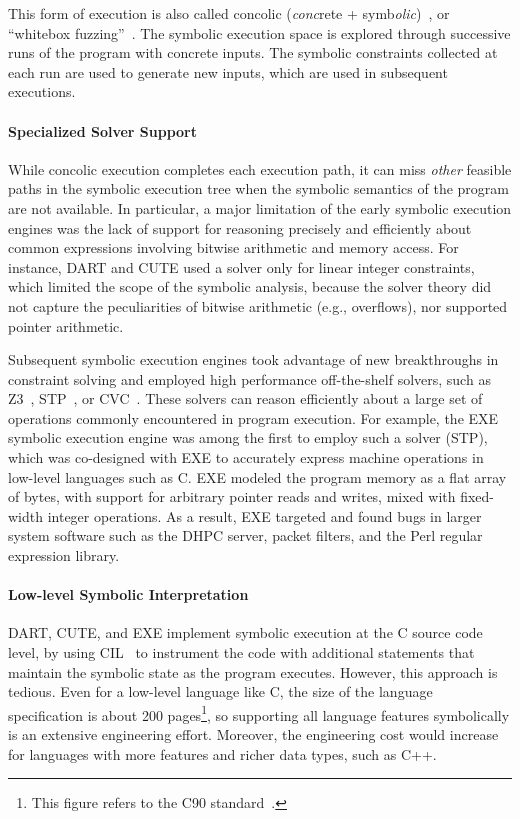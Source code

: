 This form of execution is also called concolic (\emph{conc}rete + symb\emph{olic})~\cite{cute}, or ``whitebox fuzzing''~\cite{godefroid:fuzz}.  The symbolic execution space is explored through successive runs of the program with concrete inputs.  The symbolic constraints collected at each run are used to generate new inputs, which are used in subsequent executions.


\paragraph{Specialized Solver Support}

While concolic execution completes each execution path, it can miss \emph{other} feasible paths in the symbolic execution tree when the symbolic semantics of the program are not available.
%
In particular, a major limitation of the early symbolic execution engines was the lack of support for reasoning precisely and efficiently about common expressions involving bitwise arithmetic and memory access.
%
For instance, DART and CUTE used a solver only for linear integer constraints, which limited the scope of the symbolic analysis, because the solver theory did not capture the peculiarities of bitwise arithmetic (e.g., overflows), nor supported pointer arithmetic.

Subsequent symbolic execution engines took advantage of new breakthroughs in constraint solving and employed high performance off-the-shelf solvers, such as Z3~\cite{Z3}, STP~\cite{stp}, or CVC~\cite{cvc}.  These solvers can reason efficiently about a large set of operations commonly encountered in program execution.
%
For example, the EXE~\cite{exe} symbolic execution engine was among the first to employ such a solver (STP), which was co-designed with EXE to accurately express machine operations in low-level languages such as C.
%
EXE modeled the program memory as a flat array of bytes, with support for arbitrary pointer reads and writes, mixed with fixed-width integer operations.
%
As a result, EXE targeted and found bugs in larger system software such as the  DHPC server, packet filters, and the  Perl regular expression library.

\paragraph{Low-level Symbolic Interpretation}

DART, CUTE, and EXE implement symbolic execution at the C source code level, by using CIL~\cite{cil} to instrument the code with additional statements that maintain the symbolic state as the program executes.
%
However, this approach is tedious.  Even for a low-level language like C, the size of the language specification is about 200 pages\footnote{This figure refers to the C90 standard~\cite{c90-standard}.}, so supporting all language features symbolically is an extensive engineering effort.  Moreover, the engineering cost would increase for languages with more features and richer data types, such as C++.


